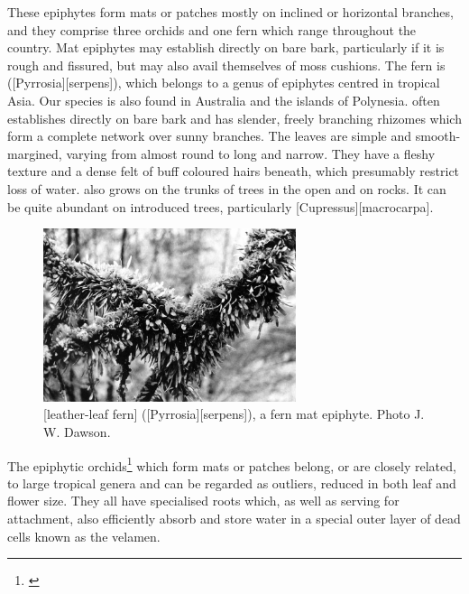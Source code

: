 These epiphytes form mats or patches mostly on inclined or horizontal branches, and they comprise three orchids and one fern which range throughout the country.
Mat epiphytes may establish directly on bare bark, particularly if it is rough and fissured, but may also avail themselves of moss cushions.
The fern is  ([Pyrrosia][serpens]), which belongs to a genus of epiphytes centred in tropical Asia.
Our species is also found in Australia and the islands of Polynesia.
 often establishes directly on bare bark and has slender, freely branching rhizomes which form a complete network over sunny branches.
The leaves are simple and smooth-margined, varying from almost round to long and narrow.
They have a fleshy texture and a dense felt of buff coloured hairs beneath, which presumably restrict loss of water.
 also grows on the trunks of trees in the open and on rocks.
It can be quite abundant on introduced trees, particularly  [Cupressus][macrocarpa].

\begin{figure}
	\includegraphics[width=0.66\textwidth]{graphics/fig_038}
	\centering
	\caption[Leather-leaf fern, \emph{Pyrrosia serpens}, a fern mat epiphyte]{[leather-leaf fern] ([Pyrrosia][serpens]), a fern mat epiphyte.
	Photo  J. W. Dawson.}%
	\label{fig:38pyrrosia}
\end{figure}

The epiphytic orchids\footnote{\cite{hatch1948epiphytic}} which form mats or patches belong, or are closely related, to large tropical genera and can be regarded as outliers, reduced in both leaf and flower size.
They all have specialised roots which, as well as serving for attachment, also efficiently absorb and store water in a special outer layer of dead cells known as the velamen.

